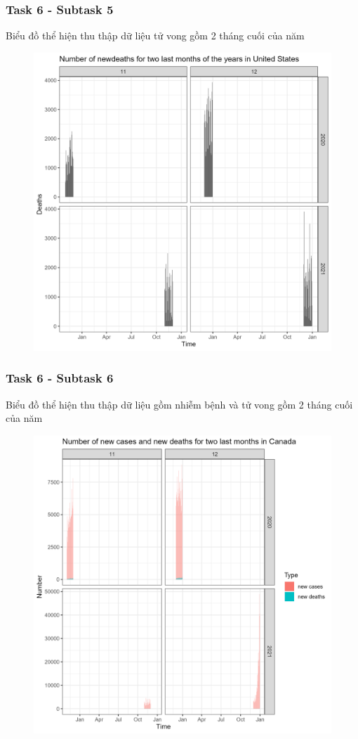 \documentclass[english,10pt,table]{beamer}
\begin{document}
\frame
{
    \frametitle{Task 6 - Subtask 5}
    \begin{block}{Biểu đồ thể hiện thu thập dữ liệu tử vong gồm 2 tháng cuối của năm}
    \begin{figure}[H]
		\centering
		\includegraphics[scale=0.105]{images/6.5.3.png}
	\end{figure}
    \end{block}
}
\frame
{
    \frametitle{Task 6 - Subtask 6}
    \begin{block}{Biểu đồ thể hiện thu thập dữ liệu gồm nhiễm bệnh và tử vong gồm 2 tháng cuối của năm}
    \begin{figure}[H]
		\centering
		\includegraphics[scale=0.105]{images/6.6.1.png}
	\end{figure}
    \end{block}
}
\end{document}
